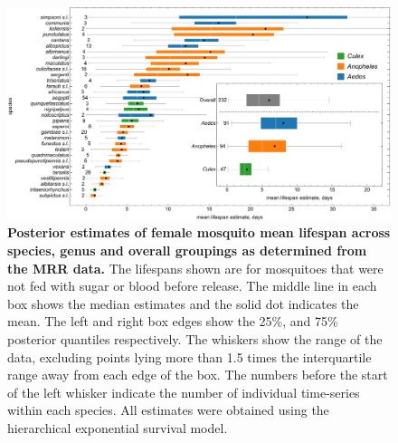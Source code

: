 \documentclass[12pt]{article}
\begin{document}
\begin{figure}[h]
	\centerline{\includegraphics[width=1\textwidth]{./Figure_files/mrr_lifetimes_final_female_without_sugar_not_blood.pdf}}
	\caption{\textbf{Posterior estimates of female mosquito mean lifespan across species, genus and overall groupings as determined from the MRR data.} The lifespans shown are for mosquitoes that were not fed with sugar or blood before release. The middle line in each box shows the median estimates and the solid dot indicates the mean. The left and right box edges show the 25\%, and 75\% posterior quantiles respectively. The whiskers show the range of the data, excluding points lying more than 1.5 times the interquartile range away from each edge of the box. The numbers before the start of the left whisker indicate the number of individual time-series within each species. All estimates were obtained using the hierarchical exponential survival model.}
	\label{fig:mrr_lifespans}
\end{figure}
\end{document}
